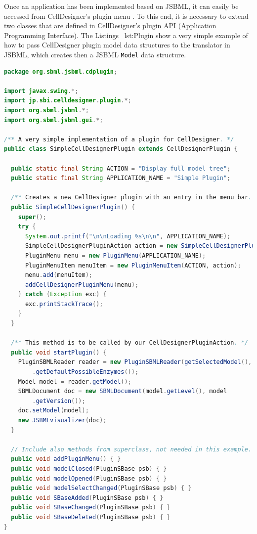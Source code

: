 Once an application has been implemented based on JSBML, it can easily be
accessed from CellDesigner's plugin menu \citep{Funahashi2003}. To this end,
it is necessary to extend two classes that are defined in CellDesigner's plugin
API (Application Programming Interface). The Listings~
{lst:Plugin} show a very simple example of how to pass CellDesigner plugin
%
model data structures to the translator in JSBML,
which creates then a JSBML \texttt{Model} data structure.
%

% 
\begin{lstlisting}[language=Java,float,caption={A simple example for a
CellDesigner plugin using JSBML as a communication layer},label=lst:Plugin]
package org.sbml.jsbml.cdplugin;

import javax.swing.*;
import jp.sbi.celldesigner.plugin.*;
import org.sbml.jsbml.*;
import org.sbml.jsbml.gui.*;

/** A very simple implementation of a plugin for CellDesigner. */
public class SimpleCellDesignerPlugin extends CellDesignerPlugin {

  public static final String ACTION = "Display full model tree";
  public static final String APPLICATION_NAME = "Simple Plugin";

  /** Creates a new CellDesigner plugin with an entry in the menu bar. */
  public SimpleCellDesignerPlugin() {
    super();
    try {
      System.out.printf("\n\nLoading %s\n\n", APPLICATION_NAME);
      SimpleCellDesignerPluginAction action = new SimpleCellDesignerPluginAction(this);
      PluginMenu menu = new PluginMenu(APPLICATION_NAME);
      PluginMenuItem menuItem = new PluginMenuItem(ACTION, action);
      menu.add(menuItem);
      addCellDesignerPluginMenu(menu);
    } catch (Exception exc) {
      exc.printStackTrace();
    }
  }

  /** This method is to be called by our CellDesignerPluginAction. */
  public void startPlugin() {
    PluginSBMLReader reader = new PluginSBMLReader(getSelectedModel(), SBO
        .getDefaultPossibleEnzymes());
    Model model = reader.getModel();
    SBMLDocument doc = new SBMLDocument(model.getLevel(), model
        .getVersion());
    doc.setModel(model);
    new JSBMLvisualizer(doc);
  }

  // Include also methods from superclass, not needed in this example.
  public void addPluginMenu() { }
  public void modelClosed(PluginSBase psb) { }
  public void modelOpened(PluginSBase psb) { }
  public void modelSelectChanged(PluginSBase psb) { }
  public void SBaseAdded(PluginSBase psb) { }
  public void SBaseChanged(PluginSBase psb) { }
  public void SBaseDeleted(PluginSBase psb) { }
}
\end{lstlisting}
